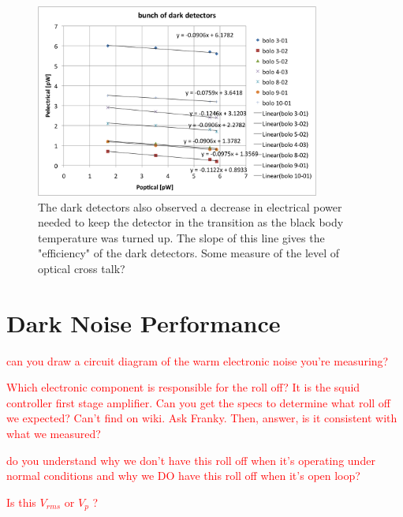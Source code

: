 \begin{figure}[ht!]
\begin{center}
\includegraphics[height=2.5in]{figures/darkdetectoreffs}
\caption{The dark detectors also observed a decrease in electrical power needed to keep the detector in the transition as the black body temperature was turned up. The slope of this line gives the "efficiency" of the dark detectors. Some measure of the level of optical cross talk?
\label{fig:dark_optical_efficiencies} }
\end{center}
\end{figure}




\section{Dark Noise Performance}
\label{sec:dark_noise}

\textcolor{red}{can you draw a circuit diagram of the warm electronic noise you're measuring?}

\textcolor{red}{Which electronic component is responsible for the roll off? It is the squid controller first stage amplifier. Can you get the specs to determine what roll off we expected? Can't find on wiki. Ask Franky. Then, answer, is it consistent with what we measured?}

\textcolor{red}{do you understand why we don't have this roll off when it's operating under normal conditions and why we DO have this roll off when it's open loop?}

\textcolor{red}{Is this $V_{rms}$ or $V_{p}$ ?}

